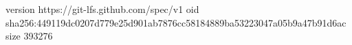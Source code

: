 version https://git-lfs.github.com/spec/v1
oid sha256:449119dc0207d779e25d901ab7876cc58184889ba53223047a05b9a47b91d6ac
size 393276
